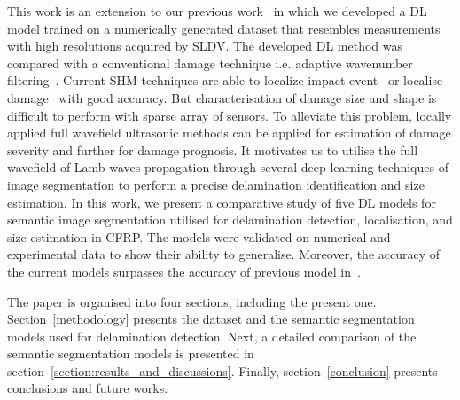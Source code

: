 This work is an extension to our previous work~\cite{Ijjeh2021} in which we developed a DL model trained on a numerically generated dataset that resembles measurements with high resolutions acquired by SLDV.
The developed DL method was compared with a conventional damage technique i.e. adaptive wavenumber filtering~\cite{Kudela2015, Radzienski2019a}.
Current SHM techniques are able to localize impact event~\cite{Ciampa2012} or localise damage~\cite{Nokhbatolfoghahai2020} with good accuracy. 
But characterisation of damage size and shape is difficult to perform with sparse array of sensors. 
To alleviate this problem, locally applied full wavefield ultrasonic methods can be applied for estimation of damage severity and further for damage prognosis.
It motivates us to utilise the full wavefield of Lamb waves propagation through several deep learning techniques of image segmentation to perform a precise delamination identification and size estimation.
In this work, we present a comparative study of five DL models for semantic image segmentation utilised for delamination detection, localisation, and size estimation in CFRP.
The models were validated on numerical and experimental data to show their ability to generalise.
Moreover, the accuracy of the current models surpasses the accuracy of previous model in~\cite{Ijjeh2021}.         

The paper is organised into four sections, including the present one.
Section~\ref{methodology} presents the dataset and the semantic segmentation models used for delamination detection. 
Next, a detailed comparison of the semantic segmentation models is presented in section~\ref{section:results_and_discussions}.
Finally, section~\ref{conclusion} presents conclusions and future works.